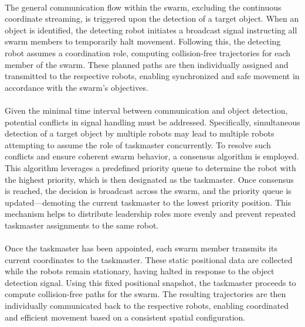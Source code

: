 \paragraph*{}
The general communication flow within the swarm, excluding the continuous coordinate streaming, is triggered upon the detection of a target object. When an object is identified, the detecting robot initiates a broadcast signal instructing all swarm members to temporarily halt movement. Following this, the detecting robot assumes a coordination role, computing collision-free trajectories for each member of the swarm. These planned paths are then individually assigned and transmitted to the respective robots, enabling synchronized and safe movement in accordance with the swarm’s objectives.

\paragraph*{}
Given the minimal time interval between communication and object detection, potential conflicts in signal handling must be addressed. Specifically, simultaneous detection of a target object by multiple robots may lead to multiple robots attempting to assume the role of taskmaster concurrently. To resolve such conflicts and ensure coherent swarm behavior, a consensus algorithm is employed. This algorithm leverages a predefined priority queue to determine the robot with the highest priority, which is then designated as the taskmaster. Once consensus is reached, the decision is broadcast across the swarm, and the priority queue is updated—demoting the current taskmaster to the lowest priority position. This mechanism helps to distribute leadership roles more evenly and prevent repeated taskmaster assignments to the same robot.

\paragraph*{}
Once the taskmaster has been appointed, each swarm member transmits its current coordinates to the taskmaster. These static positional data are collected while the robots remain stationary, having halted in response to the object detection signal. Using this fixed positional snapshot, the taskmaster proceeds to compute collision-free paths for the swarm. The resulting trajectories are then individually communicated back to the respective robots, enabling coordinated and efficient movement based on a consistent spatial configuration.
